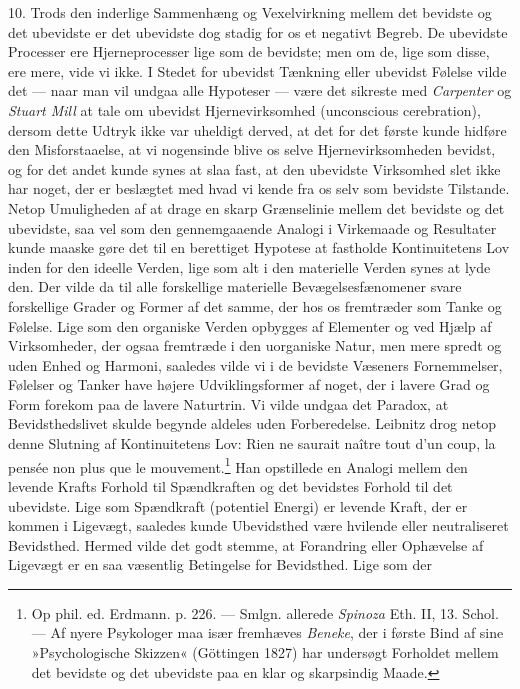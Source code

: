 \documentclass[12pt,a4paper,openany]{book}
\newcommand{\opage}[1]{\marginnote{\footnotesize\textit{[#1]}}}
\begin{document}
10. Trods den inderlige Sammenhæng og Vexelvirkning mellem det bevidste
og det ubevidste er det ubevidste dog stadig for os et negativt Begreb.
De ubevidste Processer ere Hjerneprocesser lige som de bevidste; men om
de, lige som disse, ere mere, vide vi ikke. I Stedet for ubevidst
Tænkning eller ubevidst Følelse vilde det --- naar man vil undgaa alle
Hypoteser --- være det sikreste med \emph{Carpenter} og \emph{Stuart
Mill} at tale om ubevidst Hjernevirksomhed (unconscious cerebration),
dersom dette Udtryk ikke var uheldigt derved, at det for det første
kunde hidføre den Misforstaaelse, at vi nogensinde blive os selve
Hjernevirksomheden bevidst, og for det andet kunde synes at slaa fast,
at den ubevidste Virksomhed slet ikke har noget, der er beslægtet med
hvad vi kende fra os selv som bevidste Tilstande. Netop Umuligheden af
at drage en skarp Grænselinie mellem det bevidste og det ubevidste, saa
vel som den gennemgaaende Analogi i Virkemaade og Resultater kunde
maaske gøre det til en berettiget Hypotese at fastholde Kontinuitetens
Lov inden for den ideelle Verden, lige som alt i den materielle Verden
synes at lyde den. Der vilde da til alle forskellige materielle
Bevægelsesfænomener svare forskellige Grader og Former af det samme, der
hos os fremtræder som Tanke og Følelse. Lige som den organiske Verden
opbygges af Elementer og ved Hjælp af Virksomheder, der ogsaa fremtræde
i den uorganiske Natur, men mere spredt og uden Enhed og Harmoni,
saaledes vilde vi i de bevidste Væseners Fornemmelser, Følelser og
Tanker have højere Udviklingsformer af noget, der i lavere Grad og Form
forekom
\opage{97}paa de lavere Naturtrin. Vi vilde undgaa det Paradox, at
Bevidsthedslivet skulde begynde aldeles uden Forberedelse. Leibnitz drog
netop denne Slutning af Kontinuitetens Lov: Rien ne saurait naître tout
d’un coup, la pensée non plus que le mouvement.\footnote[1]{Op phil. ed.
Erdmann. p. 226. --- Smlgn. allerede \emph{Spinoza} Eth. II, 13. Schol.
--- Af nyere Psykologer maa især fremhæves \emph{Beneke}, der i første
Bind af sine »Psychologische Skizzen« (Göttingen 1827) har undersøgt
Forholdet mellem det bevidste og det ubevidste paa en klar og
skarpsindig Maade.} Han opstillede en Analogi mellem den levende Krafts
Forhold til Spændkraften og det bevidstes Forhold til det ubevidste.
Lige som Spændkraft (potentiel Energi) er levende Kraft, der er kommen i
Ligevægt, saaledes kunde Ubevidsthed være hvilende eller neutraliseret
Bevidsthed. Hermed vilde det godt stemme, at Forandring eller Ophævelse
af Ligevægt er en saa væsentlig Betingelse for Bevidsthed. Lige som der
\end{document}
